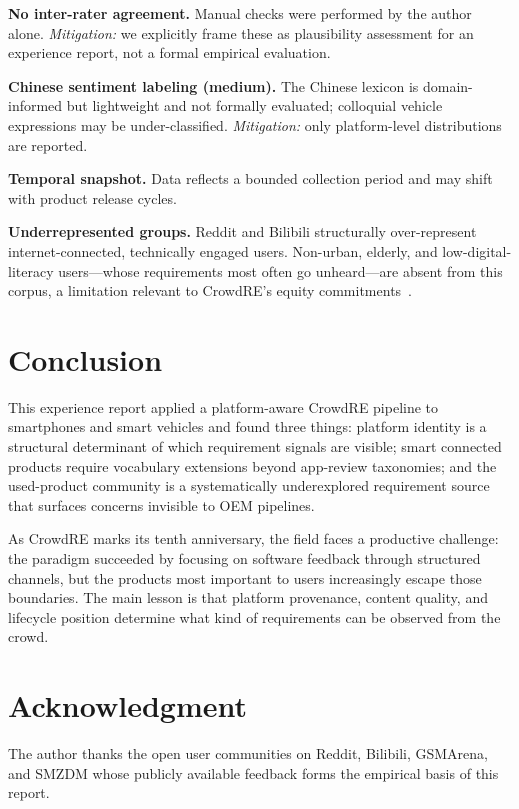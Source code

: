 \documentclass[conference]{IEEEtran}
\begin{document}
\textbf{No inter-rater agreement.} Manual checks were performed by the author alone. \textit{Mitigation:} we explicitly frame these as plausibility assessment for an experience report, not a formal empirical evaluation.

\textbf{Chinese sentiment labeling (medium).} The Chinese lexicon is domain-informed but lightweight and not formally evaluated; colloquial vehicle expressions may be under-classified. \textit{Mitigation:} only platform-level distributions are reported.

\textbf{Temporal snapshot.} Data reflects a bounded collection period and may shift with product release cycles.

\textbf{Underrepresented groups.} Reddit and Bilibili structurally over-represent internet-connected, technically engaged users. Non-urban, elderly, and low-digital-literacy users---whose requirements most often go unheard---are absent from this corpus, a limitation relevant to CrowdRE's equity commitments~\cite{Groen2017}.

\section{Conclusion}

This experience report applied a platform-aware CrowdRE pipeline to smartphones and smart vehicles and found three things: platform identity is a structural determinant of which requirement signals are visible; smart connected products require vocabulary extensions beyond app-review taxonomies; and the used-product community is a systematically underexplored requirement source that surfaces concerns invisible to OEM pipelines.

As CrowdRE marks its tenth anniversary, the field faces a productive challenge: the paradigm succeeded by focusing on software feedback through structured channels, but the products most important to users increasingly escape those boundaries. The main lesson is that platform provenance, content quality, and lifecycle position determine what kind of requirements can be observed from the crowd.

\section*{Acknowledgment}
The author thanks the open user communities on Reddit, Bilibili, GSMArena, and SMZDM whose publicly available feedback forms the empirical basis of this report.
\end{document}
